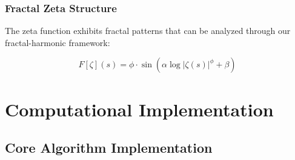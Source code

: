 \documentclass[12pt]{article}
\begin{document}
\subsubsection{Fractal Zeta Structure}

The zeta function exhibits fractal patterns that can be analyzed through our fractal-harmonic framework:

\begin{equation}
F[\zeta](s) = \phi \cdot \sin\left( \alpha \log|\zeta(s)|^\phi + \beta \right)
\end{equation}

\section{Computational Implementation}

\subsection{Core Algorithm Implementation}
\end{document}

